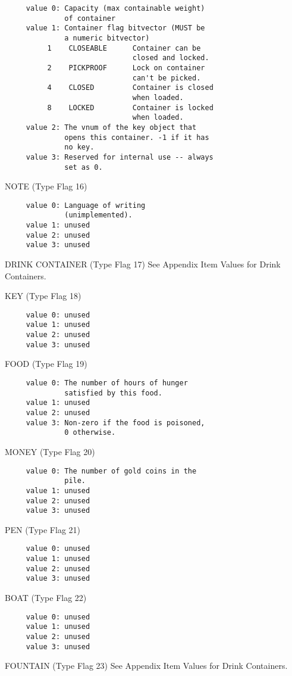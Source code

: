 \documentclass[11pt]{article}
\newenvironment{Ventry}[1]
  {\begin{list}{}{\renewcommand{\makelabel}[1]{\textsf{##1:}\hfil}
    \settowidth{\labelwidth}{\textsf{#1:}}
    \setlength{\leftmargin}{\labelwidth}
    \addtolength{\leftmargin}{\labelsep}
  }
  }
  {\end{list}}
\begin{document}
\begin{Ventry}{DRINK CONTAINER}
\begin{verbatim}
     value 0: Capacity (max containable weight)
              of container
     value 1: Container flag bitvector (MUST be
              a numeric bitvector)
          1    CLOSEABLE      Container can be
                              closed and locked.
          2    PICKPROOF      Lock on container
                              can't be picked.
          4    CLOSED         Container is closed
                              when loaded.
          8    LOCKED         Container is locked
                              when loaded.
     value 2: The vnum of the key object that
              opens this container. -1 if it has
              no key.
     value 3: Reserved for internal use -- always
              set as 0.
\end{verbatim}
\item[NOTE] (Type Flag 16)
\begin{verbatim}
     value 0: Language of writing
              (unimplemented).
     value 1: unused
     value 2: unused
     value 3: unused
\end{verbatim}
\item[DRINK CONTAINER] (Type Flag 17) See Appendix Item Values for Drink Containers.
\item[KEY] (Type Flag 18)
\begin{verbatim}
     value 0: unused
     value 1: unused
     value 2: unused
     value 3: unused
\end{verbatim}
\item[FOOD] (Type Flag 19)
\begin{verbatim}
     value 0: The number of hours of hunger
              satisfied by this food.
     value 1: unused
     value 2: unused
     value 3: Non-zero if the food is poisoned,
              0 otherwise.
\end{verbatim}
\item[MONEY] (Type Flag 20)
\begin{verbatim}
     value 0: The number of gold coins in the
              pile.
     value 1: unused
     value 2: unused
     value 3: unused
\end{verbatim}
\item[PEN] (Type Flag 21)
\begin{verbatim}
     value 0: unused
     value 1: unused
     value 2: unused
     value 3: unused
\end{verbatim}
\item[BOAT] (Type Flag 22)
\begin{verbatim}
     value 0: unused
     value 1: unused
     value 2: unused
     value 3: unused
\end{verbatim}
\item[FOUNTAIN] (Type Flag 23) See Appendix Item Values for Drink Containers.
\end{Ventry}
\end{document}
